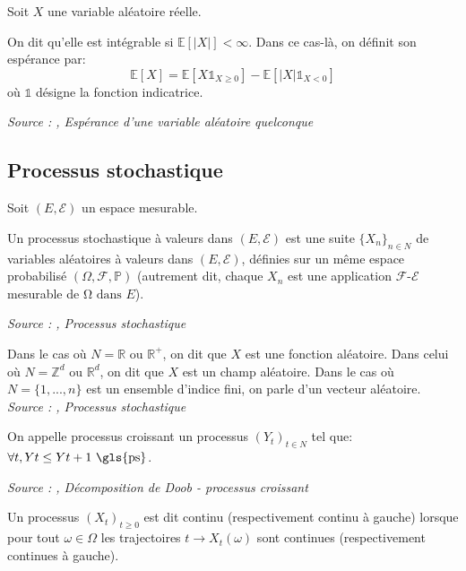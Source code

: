 \begin{definition}\label{def:va_integrable}
Soit $X$ une variable aléatoire réelle.

On dit qu'elle est intégrable si $\mathbb{E}[|X|] < \infty$. Dans ce cas-là, on définit son espérance par:
$$\mathbb{E}[X] = \mathbb{E}[X\mathbb{1}_{X \ge 0}] - \mathbb{E}[|X|\mathbb{1}_{X < 0}]$$
où $\mathbb{1}$ désigne la fonction indicatrice.

\noindent\textit{Source : \cite{ensta_cours},  Espérance d’une variable aléatoire quelconque}
\end{definition}


\subsection{Processus stochastique}

\begin{definition}\label{def:processus_stochastique}
Soit $(E, \mathcal{E})$ un espace mesurable.

Un processus stochastique à valeurs dans $(E, \mathcal{E})$ est une suite $\{X_n\}_{n \in N}$ de variables aléatoires à valeurs dans $(E, \mathcal{E})$, définies sur un même espace probabilisé $(\Omega, \mathcal{F}, \mathbb{P})$ (autrement dit, chaque $X_n$ est une application $\mathcal{F}$-$\mathcal{E}$ mesurable de $Ω \text{ dans } E$). 

\noindent\textit{Source : \cite{martingale_calcul_stochastique},  Processus stochastique}
\end{definition}

Dans le cas où $N = \mathbb{R} \text{ ou } \mathbb{R}^+$, on dit que $X$ est une fonction aléatoire.
Dans celui où $N = \mathbb{Z}^d \text{ ou } \mathbb{R}^d$, on dit que $X$ est un champ aléatoire.
Dans le cas où $N = \{1, ..., n\}$ est un ensemble d'indice fini, on parle d'un vecteur aléatoire.
\noindent\textit{Source : \cite{calcul_stochastique_diffusion},  Processus stochastique}

\begin{definition}\label{def:processus_croissant}
On appelle processus croissant un processus $(Y_t)_{t \in N}$ tel que: $\forall t, Yt \le Yt+1 \text{ \gls{ps}}$.

\noindent\textit{Source : \cite{processus_stochastique},  Décomposition de Doob - processus croissant}
\end{definition}

\begin{definition}\label{def:processus_continu}
Un processus $(X_t)_{t \ge 0}$ est dit continu (respectivement continu à gauche) lorsque pour tout $\omega \in \Omega$ les trajectoires $t \rightarrow X_t(\omega)$ sont continues (respectivement continues à gauche).
\end{definition}


